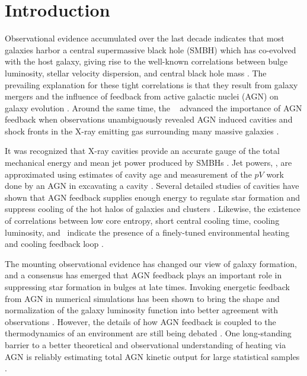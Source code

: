 \documentclass{emulateapj}
\begin{document}


\section{Introduction}
\label{sec:intro}

Observational evidence accumulated over the last decade indicates that
most galaxies harbor a central supermassive black hole (SMBH) which
has co-evolved with the host galaxy, giving rise to the well-known
correlations between bulge luminosity, stellar velocity dispersion,
and central black hole mass \citep{1995ARA&A..33..581K, magorrian,
  2000ApJ...539L...9F, 2000ApJ...539L..13G, marconihunt03,
  2005MNRAS.362...25B}. The prevailing explanation for these tight
correlations is that they result from galaxy mergers and the influence
of feedback from active galactic nuclei (AGN) on galaxy evolution
\citep[\eg][]{1998A&A...331L...1S, 2000MNRAS.311..576K}. Around the
same time, the \cxo\ \citep{chandra} advanced the importance of AGN
feedback when observations unambiguously revealed AGN induced cavities
and shock fronts in the X-ray emitting gas surrounding many massive
galaxies \citep[\eg][]{2000ApJ...534L.135M, perseus1, schindler01}.

It was recognized that X-ray cavities provide an accurate gauge of the
total mechanical energy and mean jet power produced by SMBHs
\citep{2000ApJ...534L.135M}. Jet powers, \pjet, are approximated using
estimates of cavity age and measurement of the $pV$ work done by an
AGN in excavating a cavity \citep[see][for a
  review]{mcnamrev}. Several detailed studies of cavities have shown
that AGN feedback supplies enough energy to regulate star formation
and suppress cooling of the hot halos of galaxies and clusters
\citep{birzan04, 2005MNRAS.364.1343D, rafferty06, dunn08,
  birzan08}. Likewise, the existence of correlations between low core
entropy, short central cooling time, cooling luminosity, and
\pjet\ indicate the presence of a finely-tuned environmental heating
and cooling feedback loop \citep{haradent, 2008ApJ...687..899R,
  accept}.

The mounting observational evidence has changed our view of galaxy
formation, and a consensus has emerged that AGN feedback plays an
important role in suppressing star formation in bulges at late
times. Invoking energetic feedback from AGN in numerical simulations
has been shown to bring the shape and normalization of the galaxy
luminosity function into better agreement with observations
\citep{croton06, bower06, saro06, sijacki07}. However, the details of
how AGN feedback is coupled to the thermodynamics of an environment
are still being debated \citep{2008ASPC..386..343D,
  2009arXiv0910.3691M}. One long-standing barrier to a better
theoretical and observational understanding of heating via AGN is
reliably estimating total AGN kinetic output for large statistical
samples \citep[\eg][]{1991Natur.349..138R, 1996AJ....112....9L}.
\end{document}
